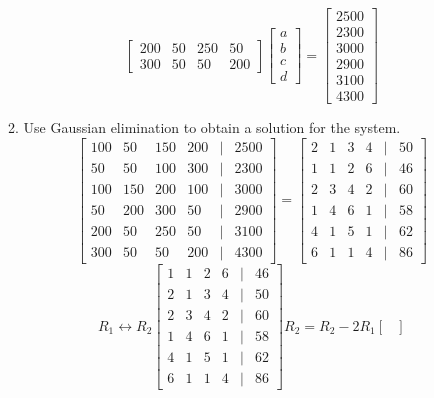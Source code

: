 \documentclass[11pt]{article}
\begin{document}
\begin{enumerate}
\begin{enumerate}
\[\begin{bmatrix}
        200 & 50 & 250 & 50 \\
        300 & 50 & 50 & 200
    \end{bmatrix}
    \begin{bmatrix}
        a \\
        b \\
        c \\
        d
    \end{bmatrix}
    = \begin{bmatrix}
        2500 \\
        2300 \\
        3000 \\
        2900 \\
        3100 \\
        4300
    \end{bmatrix}
\]
\item Use Gaussian elimination to obtain a solution for the system.
\[
    \begin{bmatrix}
        100 & 50 & 150 & 200 &|& 2500 \\
        50 & 50 & 100 & 300 &|& 2300 \\
        100 & 150 & 200 & 100 &|& 3000 \\
        50 & 200 & 300 & 50 &|& 2900 \\
        200 & 50 & 250 & 50 &|& 3100 \\
        300 & 50 & 50 & 200 &|& 4300
    \end{bmatrix} = 
    \begin{bmatrix}
        2 & 1 & 3 & 4 &|& 50 \\
        1 & 1 & 2 & 6 &|& 46 \\
        2 & 3 & 4 & 2 &|& 60 \\
        1 & 4 & 6 & 1 &|& 58 \\
        4 & 1 & 5 & 1 &|& 62 \\
        6 & 1 & 1 & 4 &|& 86
    \end{bmatrix}
\]
\[
R_1 \leftrightarrow R_2
\begin{bmatrix}
    1 & 1 & 2 & 6 &|& 46 \\
    2 & 1 & 3 & 4 &|& 50 \\
    2 & 3 & 4 & 2 &|& 60 \\
    1 & 4 & 6 & 1 &|& 58 \\
    4 & 1 & 5 & 1 &|& 62 \\
    6 & 1 & 1 & 4 &|& 86
\end{bmatrix}
R_2 = R_2 - 2R_1
\begin{bmatrix}

\end{bmatrix}\]
\end{enumerate}
\end{enumerate}
\end{document}
